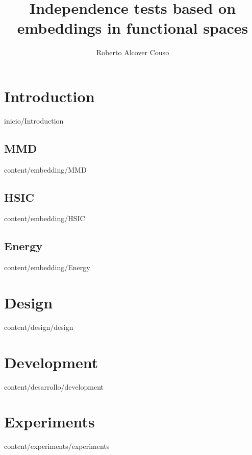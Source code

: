 \documentclass[epsbased,copyright,final,english,printable,covers,extendedindex,firstnumbered,tfg,gnuplot]{tfgtfmthesisuam}
\title[Independence tests]{Independence tests based on embeddings in functional spaces}
\author{Roberto Alcover Couso}
\begin{document}
\chapter{Introduction\label{CAP:INTRODUCCION}}{inicio/Introduction}
	\section{MMD\label{SEC:MMD}}{content/embedding/MMD}
	\section{HSIC\label{SEC:HSIC}}{content/embedding/HSIC}
	\section{Energy\label{SEC:Energy}}{content/embedding/Energy}
\chapter{Design\label{CAP:DEV}}{content/design/design}
\chapter{Development\label{CAP:DEVPMT}}{content/desarrollo/development}
\chapter{Experiments\label{Cap:Experiments}}{content/experiments/experiments}
\end{document}
